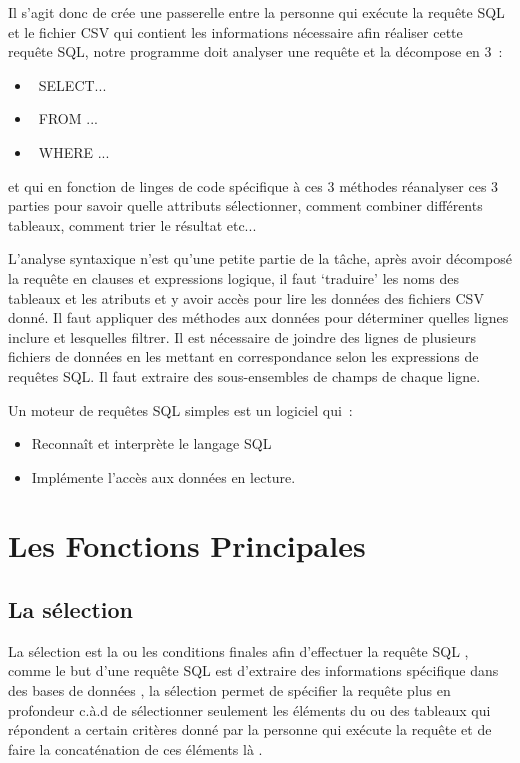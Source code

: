 \documentclass[oneside,13pt,a4paper]{report}
\begin{document}
        Il s’agit donc de crée une passerelle entre la personne qui exécute la requête SQL et le fichier CSV qui contient les informations nécessaire afin réaliser cette requête SQL, 
        notre programme doit analyser une requête et la décompose en 3 : 
        \begin{itemize}
            \item SELECT...
            \item FROM ...
            \item WHERE ...
        \end{itemize}
        et qui en fonction de linges de code spécifique à ces 3 méthodes réanalyser ces 3 parties pour savoir quelle attributs sélectionner, 
        comment combiner différents tableaux, comment trier le résultat etc... 

        L’analyse syntaxique n’est qu’une petite partie de la tâche, 
        après avoir décomposé la requête en clauses et expressions logique, 
        il faut ‘traduire’ les noms des tableaux et les atributs et y avoir accès pour lire les données des fichiers CSV donné. 
        Il faut appliquer des méthodes aux données pour déterminer quelles lignes inclure et lesquelles filtrer. 
        Il est nécessaire de joindre des lignes de plusieurs fichiers de données en les mettant en correspondance selon les expressions de requêtes SQL. 
        Il faut extraire des sous-ensembles de champs de chaque ligne.
        
        Un moteur de requêtes SQL simples est un logiciel qui :
        \begin{itemize}
            \item Reconnaît et interprète le langage SQL
            \item Implémente l’accès aux données en lecture.
        \end{itemize}

    \section{Les Fonctions Principales}

        \subsection{La sélection}

            La sélection est la ou les conditions finales afin d'effectuer la requête SQL , comme le but d'une requête SQL est d'extraire des informations spécifique dans des bases de données , la sélection permet de spécifier la requête plus en profondeur c.à.d de sélectionner seulement les éléments du ou des tableaux qui répondent a certain critères donné par la personne qui exécute la requête et de faire la concaténation de ces éléments là .
\end{document}
